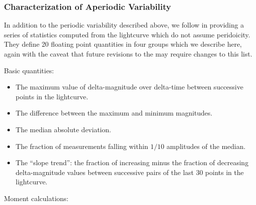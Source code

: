 \subsubsection{Characterization of Aperiodic Variability}

In addition to the periodic variability described above, we follow \cite{2011ApJ...733...10R} in providing a series of statistics computed from the lightcurve which do not assume peridoicity. They define 20 floating point quantities in four groups which we describe here, again with the caveat that future revisions to the \DPDD{} may require changes to this list.

Basic quantities:

\begin{itemize}
\item{The maximum value of delta-magnitude over delta-time between successive points in the lightcurve.}
\item{The difference between the maximum and minimum magnitudes.}
\item{The median absolute deviation.}
\item{The fraction of measurements falling within $1/10$ amplitudes of the median.}
\item{The ``slope trend'': the fraction of increasing minus the fraction of decreasing delta-magnitude values between successive pairs of the last 30 points in the lightcurve.}
\end{itemize}

Moment calculations:

